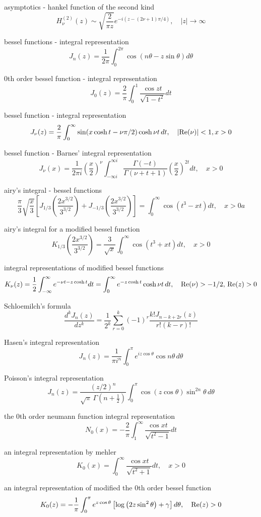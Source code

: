 asymptotics - hankel function of the second kind
$$
H^{(2)}_\nu(z) \sim \sqrt{\frac{2}{\pi z}}e^{-i(z-(2\nu+1)\pi/4)}, \quad |z|\rightarrow\infty
$$

bessel functions - integral representation
$$
J_n(z)=\frac{1}{2\pi}\int^{2\pi}_0\cos(n\theta-z\sin\theta)d\theta
$$

0th order bessel function - integral representation
$$
J_0(z)=\frac{2}{\pi}\int^1_0 \frac{\cos zt}{\sqrt{1-t^2}} dt
$$

bessel function - integral representation
$$
J_\nu(z)=\frac{2}{\pi}\int^\infty_0 \sin(x\cosh t-\nu\pi/2)\cosh \nu t\, dt, \quad |{\rm Re}(\nu)|<1,x>0
$$

bessel function - Barnes’ integral representation
$$
J_\nu(x)=\frac{1}{2\pi i}\left(\frac{x}{2}\right)^{\nu}\int^{\infty i}_{-\infty i}\frac{\Gamma(-t)}{\Gamma(\nu+t+1)}\left(\frac{x}{2}\right)^{2t}dt,\quad x>0
$$

airy’s integral - bessel functions
$$
\frac{\pi}{3}\sqrt{\frac{x}{3}}\left[J_{1/3}\left(\frac{2x^{3/2}}{3^{3/2}}\right)+J_{-1/3}\left(\frac{2x^{3/2}}{3^{3/2}}\right)\right]=\int^\infty_0 \cos(t^3-xt)dt, \quad x>0a
$$

airy’s integral for a modified bessel function
$$
K_{1/3}\left(\frac{2x^{3/2}}{3^{3/2}}\right)=\frac{3}{\sqrt{x}}\int^\infty_0 \cos(t^3+xt)dt, \quad x>0
$$


integral representations of modified bessel functions
$$
K_\nu(z)=\frac{1}{2}\int^\infty_{-\infty}e^{-\nu t-z\cosh t}dt=\int^\infty_0 e^{-z\cosh t}\cosh \nu t \, dt, \quad {\rm Re}(\nu)>-1/2,\,{\rm Re}(z)>0
$$

Schloemilch’s formula
$$
\frac{d^k J_n(z)}{d z^k}=\frac{1}{2^k}\sum^k_{r=0}(-1)^r \frac{k! J_{n-k+2r}(z)}{r! (k-r)!}
$$

Hasen’s integral representation 
$$
J_n(z)=\frac{1}{\pi i^n}\int^\pi_0 e^{i z \cos\theta} \cos n\theta \, d\theta
$$
 
Poisson’s integral representation
$$
J_n(z)=\frac{(z/2)^n}{\sqrt{\pi} \, \Gamma(n+\frac{1}{2})}\int^\pi_0 \cos(z\cos\theta) \sin^{2n}\theta \, d\theta
$$

the 0th order neumann function integral representation
$$
N_0(x)=-\frac{2}{\pi}\int^\infty_1 \frac{\cos xt}{\sqrt{t^2-1}}dt
$$

an integral representation by mehler
$$
K_0(x)=\int^\infty_0\frac{\cos xt}{\sqrt{t^2+1}}dt, \quad x>0
$$

an integral representation of modified the 0th order bessel function
$$
K_0(z)=-\frac{1}{\pi}\int^\pi_0 e^{z \cos\theta}\left[\log \left(2z \sin^2 \theta\right)+\gamma\right] d\theta, \quad {\rm Re}(z)>0
$$

